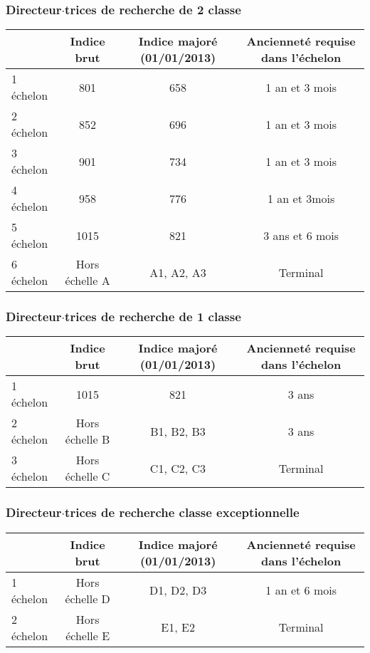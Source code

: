 \subsubsection*{Directeur$\cdot$trices de recherche de 2\ieme{} classe}
\begin{center}
\begin{tabular}{lccc}
\toprule
& Indice brut& Indice major\'e (01/01/2013)& Anciennet\'e requise dans l'\'echelon \\
\midrule
1\ier{} \'echelon &801&658& 1 an et 3 mois\\

2\ieme{} \'echelon &852&696& 1 an et 3 mois\\

3\ieme{} \'echelon &901&734& 1 an et 3 mois\\

4\ieme{} \'echelon &958&776 &1 an et 3mois\\

5\ieme{} \'echelon &1015&821 & 3 ans et 6 mois\\

6\ieme{} \'echelon &Hors \'echelle A&A1, A2, A3&Terminal \\
\bottomrule
\end{tabular}
\end{center}


\subsubsection*{Directeur$\cdot$trices de recherche de 1\iere{} classe}
\begin{center}
\begin{tabular}{lccc}
\toprule
& Indice brut& Indice major\'e (01/01/2013)& Anciennet\'e requise dans l'\'echelon \\
\midrule
1\ier{} \'echelon &1015&821& 3 ans \\

2\ieme{} \'echelon &Hors \'echelle B&B1, B2, B3& 3 ans \\

3\ieme{} \'echelon &Hors \'echelle C&C1, C2, C3& Terminal\\
\bottomrule
\end{tabular}
\end{center}

\subsubsection*{Directeur$\cdot$trices de recherche classe exceptionnelle}
\begin{center}
\begin{tabular}{lccc}
\toprule
& Indice brut& Indice major\'e (01/01/2013)& Anciennet\'e requise dans l'\'echelon \\
\midrule
1\ier{} \'echelon &Hors \'echelle D&D1, D2, D3& 1 an et 6 mois \\

2\ieme{} \'echelon &Hors \'echelle E&E1, E2& Terminal \\
\bottomrule
\end{tabular}
\end{center}

